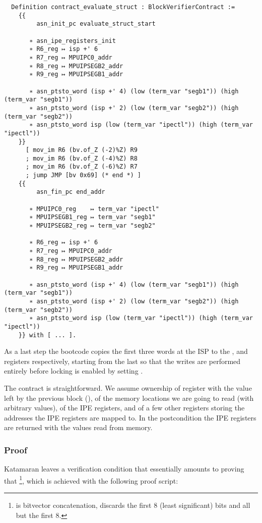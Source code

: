\begin{verbatim}
  Definition contract_evaluate_struct : BlockVerifierContract :=
    {{
         asn_init_pc evaluate_struct_start

       ∗ asn_ipe_registers_init
       ∗ R6_reg ↦ isp +' 6
       ∗ R7_reg ↦ MPUIPC0_addr
       ∗ R8_reg ↦ MPUIPSEGB2_addr
       ∗ R9_reg ↦ MPUIPSEGB1_addr

       ∗ asn_ptsto_word (isp +' 4) (low (term_var "segb1")) (high (term_var "segb1"))
       ∗ asn_ptsto_word (isp +' 2) (low (term_var "segb2")) (high (term_var "segb2"))
       ∗ asn_ptsto_word isp (low (term_var "ipectl")) (high (term_var "ipectl"))
    }}
      [ mov_im R6 (bv.of_Z (-2)%Z) R9
      ; mov_im R6 (bv.of_Z (-4)%Z) R8
      ; mov_im R6 (bv.of_Z (-6)%Z) R7
      ; jump JMP [bv 0x69] (* end *) ]
    {{
         asn_fin_pc end_addr

       ∗ MPUIPC0_reg    ↦ term_var "ipectl"
       ∗ MPUIPSEGB1_reg ↦ term_var "segb1"
       ∗ MPUIPSEGB2_reg ↦ term_var "segb2"

       ∗ R6_reg ↦ isp +' 6
       ∗ R7_reg ↦ MPUIPC0_addr
       ∗ R8_reg ↦ MPUIPSEGB2_addr
       ∗ R9_reg ↦ MPUIPSEGB1_addr

       ∗ asn_ptsto_word (isp +' 4) (low (term_var "segb1")) (high (term_var "segb1"))
       ∗ asn_ptsto_word (isp +' 2) (low (term_var "segb2")) (high (term_var "segb2"))
       ∗ asn_ptsto_word isp (low (term_var "ipectl")) (high (term_var "ipectl"))
    }} with [ ... ].
\end{verbatim}

As a last step the bootcode copies the first three words at the ISP to the ,  and  registers respectively, starting from the last so that the writes are performed entirely before locking is enabled by setting .

The contract is straightforward. We assume ownership of register  with the value left by the previous block (), of the memory locations we are going to read (with arbitrary values), of the IPE registers, and of a few other registers storing the addresses the IPE registers are mapped to. In the postcondition the IPE registers are returned with the values read from memory.

\subsubsection{Proof}

Katamaran leaves a verification condition that essentially amounts to proving that \footnote{ is bitvector concatenation,  discards the first 8 (least significant) bits and  all but the first 8.}, which is achieved with the following proof script:

